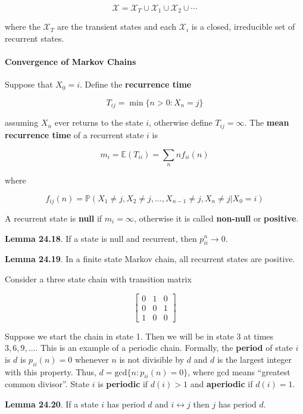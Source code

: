 \[ \mathcal{X} = \mathcal{X}_{T} \cup \mathcal{X}_{1} \cup \mathcal{X}_{2} \cup \cdots \]

where the \(\mathcal{X}_T\) are the transient states and each
\(\mathcal{X}_i\) is a closed, irreducible set of recurrent states.

\paragraph{Convergence of Markov Chains}\label{convergence-of-markov-chains}

Suppose that \(X_0 = i\). Define the \textbf{recurrence time}

\[ T_{ij} = \min \{ n > 0 : X_n = j \} \]

assuming \(X_n\) ever returns to the state \(i\), otherwise define
\(T_{ij} = \infty\). The \textbf{mean recurrence time} of a recurrent
state \(i\) is

\[ m_i = \mathbb{E}(T_{ii}) = \sum_n n f_{ii}(n) \]

where

\[ f_{ij}(n) = \mathbb{P}(X_1 \neq j, X_2 \neq j, \dots, X_{n-1} \neq j, X_n \neq j | X_0 = i) \]

A recurrent state is \textbf{null} if \(m_i = \infty\), otherwise it is
called \textbf{non-null} or \textbf{positive}.

\textbf{Lemma 24.18}. If a state is null and recurrent, then
\(p_{ii}^n \rightarrow 0\).

\textbf{Lemma 24.19}. In a finite state Markov chain, all recurrent
states are positive.

Consider a three state chain with transition matrix

\[
\begin{bmatrix}
0 & 1 & 0 \\
0 & 0 & 1 \\
1 & 0 & 0
\end{bmatrix}
\]

Suppose we start the chain in state 1. Then we will be in state 3 at
times \(3, 6, 9, \dots\). This is an example of a periodic chain.
Formally, the \textbf{period} of state \(i\) is \(d\) is
\(p_{ii}(n) = 0\) whenever \(n\) is not divisible by \(d\) and \(d\) is
the largest integer with this property. Thus,
\(d = \text{gcd} \{ n : p_{ii}(n) = 0 \}\), where gcd means ``greatest
common divisor''. State \(i\) is \textbf{periodic} if \(d(i) > 1\) and
\textbf{aperiodic} if \(d(i) = 1\).

\textbf{Lemma 24.20}. If a state \(i\) has period \(d\) and
\(i \leftrightarrow j\) then \(j\) has period \(d\).

